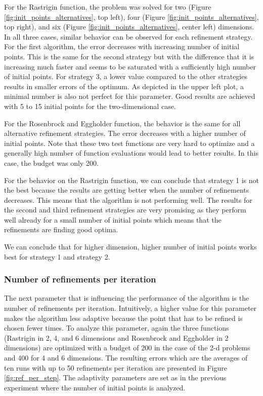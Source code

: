 For the Rastrigin function, the problem was solved for two (Figure \ref{fig:init_points_alternatives}, top left), four (Figure \ref{fig:init_points_alternatives}, top right), and six  (Figure \ref{fig:init_points_alternatives}, center left) dimensions. In all three cases, similar behavior can be observed for each refinement strategy. For the first algorithm, the error decreases with increasing number of initial points. This is the same for the second strategy but with the difference that it is increasing much faster and seems to be saturated with a sufficiently high number of initial points. For strategy 3, a lower value compared to the other strategies results in smaller errors of the optimum. As depicted in the upper left plot, a minimal number is also not perfect for this parameter. Good results are achieved with 5 to 15 initial points for the two-dimensional case. 

For the Rosenbrock and Eggholder function, the behavior is the same for all alternative refinement strategies. The error decreases with a higher number of initial points. Note that these two test functions are very hard to optimize and a generally high number of function evaluations would lead to better results. In this case, the budget was only 200. \newline 

For the behavior on the Rastrigin function, we can conclude that strategy 1 is not the best because the results are getting better when the number of refinements decreases. This means that the algorithm is not performing well. The results for the second and third refinement strategies are very promising as they perform well already for a small number of initial points which means that the refinements are finding good optima. \newline 

We can conclude that for higher dimension, higher number of initial points works best for strategy 1 and strategy 2.



\subsubsection{Number of refinements per iteration}

The next parameter that is influencing the performance of the algorithm is the number of refinements per iteration. Intuitively, a higher value for this parameter makes the algorithm less adaptive because the point that has to be refined is chosen fewer times. To analyze this parameter, again the three functions (Rastrigin in 2, 4, and 6 dimensions and Rosenbrock and Eggholder in 2 dimensions) are optimized with a budget of 200 in the case of the 2-d problems and 400 for 4 and 6 dimensions. The resulting errors which are the averages of ten runs with up to 50 refinements per iteration are presented in Figure \ref{fig:ref_per_step}. The adaptivity parameters are set as in the previous experiment where the number of initial points is analyzed. \newline 

